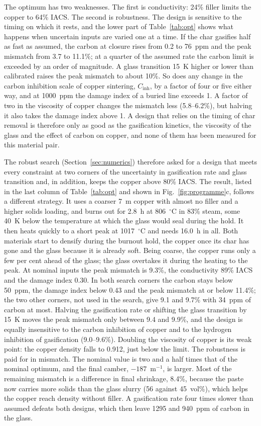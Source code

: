 The optimum has two weaknesses. The first is conductivity: 24\% filler limits the copper to 64\% IACS. The second is robustness. The design is sensitive to the timing on which it rests, and the lower part of Table~\ref{tab:opt} shows what happens when uncertain inputs are varied one at a time. If the char gasifies half as fast as assumed, the carbon at closure rises from 0.2 to 76~ppm and the peak mismatch from 3.7 to 11.1\%; at a quarter of the assumed rate the carbon limit is exceeded by an order of magnitude. A glass transition 15~K higher or lower than calibrated raises the peak mismatch to about 10\%. So does any change in the carbon inhibition scale of copper sintering, $C_{\mathrm{inh}}$, by a factor of four or five either way, and at 1000~ppm the damage index of a buried line exceeds 1. A factor of two in the viscosity of copper changes the mismatch less (5.8--6.2\%), but halving it also takes the damage index above 1. A design that relies on the timing of char removal is therefore only as good as the gasification kinetics, the viscosity of the glass and the effect of carbon on copper, and none of them has been measured for this material pair.

The robust search (Section~\ref{sec:numerics}) therefore asked for a design that meets every constraint at two corners of the uncertainty in gasification rate and glass transition and, in addition, keeps the copper above 80\% IACS. The result, listed in the last column of Table~\ref{tab:opt} and shown in Fig.~\ref{fig:programme}c, follows a different strategy. It uses a coarser 7~\textmu m copper with almost no filler and a higher solids loading, and burns out for 2.8~h at 806~$^\circ$C in 83\% steam, some 40~K below the temperature at which the glass would seal during the hold. It then heats quickly to a short peak at 1017~$^\circ$C and needs 16.0~h in all. Both materials start to densify during the burnout hold, the copper once its char has gone and the glass because it is already soft. Being coarse, the copper runs only a few per cent ahead of the glass; the glass overtakes it during the heating to the peak. At nominal inputs the peak mismatch is 9.3\%, the conductivity 89\% IACS and the damage index 0.30. In both search corners the carbon stays below 50~ppm, the damage index below 0.43 and the peak mismatch at or below 11.4\%; the two other corners, not used in the search, give 9.1 and 9.7\% with 34~ppm of carbon at most. Halving the gasification rate or shifting the glass transition by 15~K moves the peak mismatch only between 9.4 and 9.9\%, and the design is equally insensitive to the carbon inhibition of copper and to the hydrogen inhibition of gasification (9.0--9.6\%). Doubling the viscosity of copper is its weak point: the copper density falls to 0.912, just below the limit. The robustness is paid for in mismatch. The nominal value is two and a half times that of the nominal optimum, and the final camber, $-187$~m$^{-1}$, is larger. Most of the remaining mismatch is a difference in final shrinkage, 8.4\%, because the paste now carries more solids than the glass slurry (56 against 45~vol\%), which helps the copper reach density without filler. A gasification rate four times slower than assumed defeats both designs, which then leave 1295 and 940~ppm of carbon in the glass.

